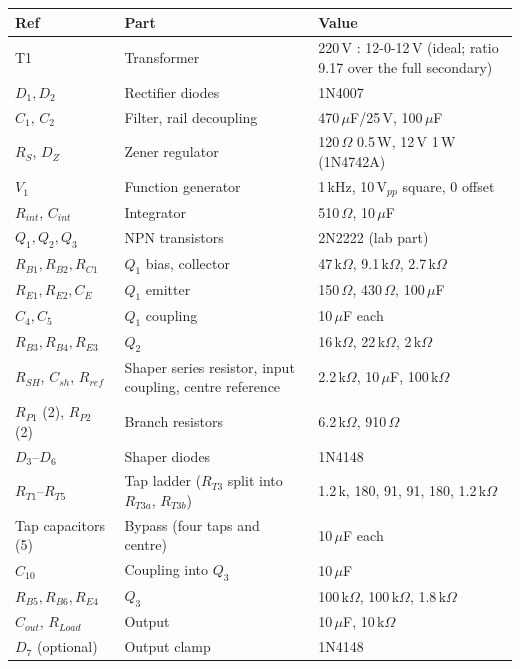 \begin{center}
\small
\begin{tabularx}{\textwidth}{@{}llX@{}}
\toprule
Ref & Part & Value \\
\midrule
T1 & Transformer & 220\,V : 12-0-12\,V (ideal; ratio 9.17 over the full secondary) \\
$D_1,D_2$ & Rectifier diodes & 1N4007 \\
$C_1$, $C_2$ & Filter, rail decoupling & 470\,$\mu$F/25\,V, 100\,$\mu$F \\
$R_S$, $D_Z$ & Zener regulator & 120\,$\Omega$ 0.5\,W, 12\,V 1\,W (1N4742A) \\
$V_1$ & Function generator & 1\,kHz, 10\,V$_{pp}$ square, 0 offset \\
$R_{int}$, $C_{int}$ & Integrator & 510\,$\Omega$, 10\,$\mu$F \\
$Q_1,Q_2,Q_3$ & NPN transistors & 2N2222 (lab part) \\
$R_{B1},R_{B2},R_{C1}$ & $Q_1$ bias, collector & 47\,k$\Omega$, 9.1\,k$\Omega$, 2.7\,k$\Omega$ \\
$R_{E1},R_{E2},C_E$ & $Q_1$ emitter & 150\,$\Omega$, 430\,$\Omega$, 100\,$\mu$F \\
$C_4,C_5$ & $Q_1$ coupling & 10\,$\mu$F each \\
$R_{B3},R_{B4},R_{E3}$ & $Q_2$ & 16\,k$\Omega$, 22\,k$\Omega$, 2\,k$\Omega$ \\
$R_{SH}$, $C_{sh}$, $R_{ref}$ & Shaper series resistor, input coupling, centre reference & 2.2\,k$\Omega$, 10\,$\mu$F, 100\,k$\Omega$ \\
$R_{P1}$ (2), $R_{P2}$ (2) & Branch resistors & 6.2\,k$\Omega$, 910\,$\Omega$ \\
$D_3$--$D_6$ & Shaper diodes & 1N4148 \\
$R_{T1}$--$R_{T5}$ & Tap ladder ($R_{T3}$ split into $R_{T3a}$, $R_{T3b}$) & 1.2\,k, 180, 91, 91, 180, 1.2\,k$\Omega$ \\
Tap capacitors (5) & Bypass (four taps and centre) & 10\,$\mu$F each \\
$C_{10}$ & Coupling into $Q_3$ & 10\,$\mu$F \\
$R_{B5},R_{B6},R_{E4}$ & $Q_3$ & 100\,k$\Omega$, 100\,k$\Omega$, 1.8\,k$\Omega$ \\
$C_{out}$, $R_{Load}$ & Output & 10\,$\mu$F, 10\,k$\Omega$ \\
$D_7$ (optional) & Output clamp & 1N4148 \\
\bottomrule
\end{tabularx}
\end{center}



